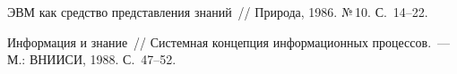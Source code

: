 \begin{multicols}{2}
{{\begin{thebibliography}{99}
     ЭВМ как средство представления знаний~// Природа, 1986. №\,10. С.~14--22.
\label{end\stat}

     Информация и знание~// Системная концепция информационных процессов.~--- М.:
\mbox{ВНИИСИ}, 1988. С.~47--52.

\end{thebibliography}

}
}

\end{multicols}